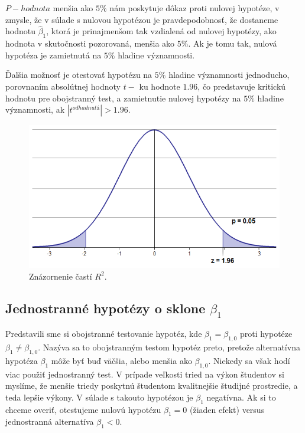 \documentclass[]{tukediphc}
\begin{document}
$P-hodnota$ menšia ako $5\%$ nám poskytuje dôkaz proti nulovej hypotéze, v zmysle, že v súlade s nulovou hypotézou je pravdepodobnosť, že dostaneme hodnotu $\hat\beta_{1}$, ktorá je prinajmenšom tak vzdialená od nulovej hypotézy, ako hodnota v skutočnosti pozorovaná, menšia ako $5\%$. Ak je tomu tak, nulová hypotéza je zamietnutá na $5\%$ hladine významnosti.  

Ďalšia možnosť je otestovať hypotézu na $5\%$ hladine významnosti jednoducho, porovnaním absolútnej hodnoty $t-$ ku hodnote $1.96$, čo predstavuje kritickú hodnotu pre obojstranný test, a zamietnutie nulovej hypotézy na $5\%$ hladine významnosti, ak $|t^{odhadnutá}| > 1.96$.

\begin{figure} 
    \centering 
    \includegraphics[scale = 0.5]{diplomka obrazky/12.png} 
    \caption{Znázornenie častí $R^2$.} 
\end{figure} 

\subsection{Jednostranné hypotézy o sklone $\beta_{1}$}

Predstavili sme si obojstranné testovanie hypotéz, kde $\beta_{1} = \beta_{1, 0}$ proti hypotéze $\beta_{1} \neq \beta_{1, 0}$. Nazýva sa to obojstranným testom hypotéz preto, pretože alternatívna hypotéza $\beta_{1}$ môže byť buď väčšia, alebo menšia ako $\beta_{1, 0}$. Niekedy sa však hodí viac použiť jednostranný test. V prípade veľkosti tried na výkon študentov si myslíme, že menšie triedy poskytnú študentom kvalitnejšie študijné prostredie, a teda lepšie výkony. V súlade s takouto hypotézou je $\beta_{1}$ negatívna. Ak si to chceme overiť, otestujeme nulovú hypotézu $\beta_{1} = 0$ (žiaden efekt) versus jednostranná alternatíva $\beta_{1} < 0$.  
\end{document}
